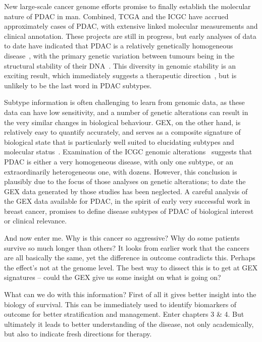\documentclass[thesis.tex]{subfiles}
\begin{document}
New large-scale cancer genome efforts promise to finally establish the molecular nature of \gls{PDAC} in man.  Combined, \gls{TCGA} and the \gls{ICGC} have accrued approximately  cases of \gls{PDAC}, with extensive linked molecular measurements and clinical annotation.  These projects are still in progress, but early analyses of data to date have indicated that \gls{PDAC} is a relatively genetically homogeneous disease~\cite{Biankin2012}, with the primary genetic variation between tumours being in the structural stability of their DNA~\cite{Waddell2015}.  This diversity in genomic stability is an exciting result, which immediately suggests a therapeutic direction~\cite{Waddell2015}, but is unlikely to be the last word in \gls{PDAC} subtypes.

Subtype information is often challenging to learn from genomic data, as these data can have low sensitivity, and a number of genetic alterations can result in the very similar changes in biological behaviour.  \Gls{GEX}, on the other hand, is relatively easy to quantify accurately, and serves as a composite signature of biological state that is particularly well suited to elucidating subtypes and molecular status~\cite{Ray2014}.  Examination of the \gls{ICGC} genomic alterations~\cite{Biankin2012, Waddell2015} suggests that \gls{PDAC} is either a very homogeneous disease, with only one subtype, or an extraordinarily heterogeneous one, with dozens.  However, this conclusion is plausibly due to the focus of those analyses on genetic alterations; to date the \gls{GEX} data generated by those studies has been neglected.  A careful analysis of the \gls{GEX} data available for \gls{PDAC}, in the spirit of early very successful work in breast cancer, promises to define disease subtypes of \gls{PDAC} of biological interest or clinical relevance.



And now enter me.  Why is this cancer so aggressive?  Why do some patients survive so much longer than others?  It looks from earlier work that the cancers are all basically the same, yet the difference in outcome contradicts this.  Perhaps the effect's not at the genome level.  The best way to dissect this is to get at GEX signatures -- could the GEX give us some insight on what is going on?

What can we do with this information?  First of all it gives better insight into the biology of survival.  This can be immediately used to identify biomarkers of outcome for better stratification and management.  Enter chapters 3 & 4.  But ultimately it leads to better understanding of the disease, not only academically, but also to indicate fresh directions for therapy.
\end{document}
